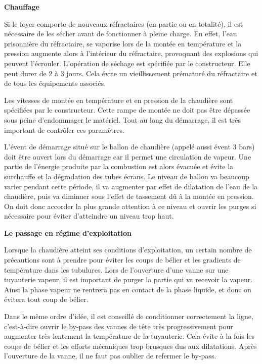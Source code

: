 \vspace{0.3cm}
\textbf{Chauffage}
\vspace{0.3cm}

Si le foyer comporte de nouveaux réfractaires (en partie ou en totalité), il est nécessaire de les sécher avant de fonctionner à pleine charge. En effet, l’eau prisonnière du réfractaire, se vaporise lors de la montée en température et la pression augmente alors à l’intérieur du réfractaire, provoquant des explosions qui peuvent l’écrouler. L’opération de séchage est spécifiée par le constructeur. Elle peut durer de 2 à 3 jours. Cela évite un vieillissement prématuré du réfractaire et de tous les équipements associés.
\vspace{0.3cm}

Les vitesses de montée en température et en pression de la chaudière sont spécifiées par le constructeur. Cette rampe de montée ne doit pas être dépassée sous peine d’endommager le matériel. Tout au long du démarrage, il est très important de contrôler ces paramètres.
\vspace{0.3cm}

L’évent de démarrage situé sur le ballon de chaudière (appelé aussi évent 3 bars) doit être ouvert lors du démarrage car il permet une circulation de vapeur. Une partie de l’énergie produite par la combustion est alors évacuée et évite la surchauffe et la dégradation des tubes écrans.
Le niveau de ballon va beaucoup varier pendant cette période, il va augmenter par effet de dilatation de l’eau de la chaudière, puis va diminuer sous l’effet de tassement dû à la montée en pression. On doit donc accorder la plus grande attention à ce niveau et ouvrir les purges si nécessaire pour éviter d’atteindre un niveau trop haut.


\vspace{0.3cm}
\textbf{Le passage en régime d’exploitation}
\vspace{0.3cm}

Lorsque la chaudière atteint ses conditions d’exploitation, un certain nombre de précautions sont à prendre pour éviter les coups de bélier et les gradients de température dans les tubulures.
Lors de l’ouverture d’une vanne sur une tuyauterie vapeur, il est important de purger la partie qui va recevoir la vapeur. Ainsi la phase vapeur ne rentrera pas en contact de la phase liquide, et donc on évitera tout coup de bélier. 
\vspace{0.3cm}

Dans le même ordre d’idée, il est conseillé de conditionner correctement la ligne, c’est-à-dire ouvrir le by-pass des vannes de tête très progressivement pour augmenter très lentement la température de la tuyauterie. Cela évite à la fois les coups de bélier et les efforts mécaniques trop brusques dus aux dilatations.
Après l’ouverture de la vanne, il ne faut pas oublier de refermer le by-pass.


